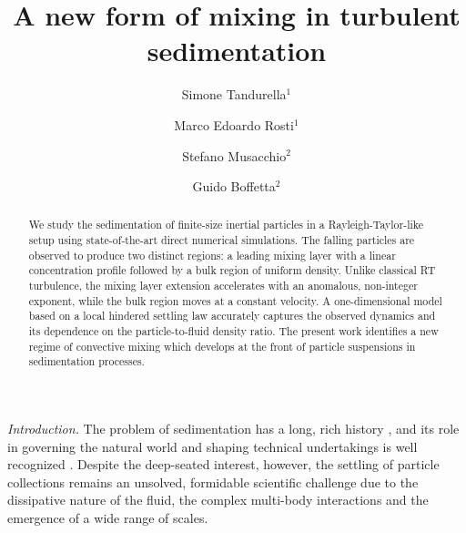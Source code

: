 \documentclass[aps,prl,twocolumn,showpacs,longbibliography]{revtex4-1}
\begin{document}

\title{A new form of mixing in turbulent sedimentation}






\author{Simone Tandurella$^{1}$}

\author{Marco Edoardo Rosti$^{1}$}

\author{Stefano Musacchio$^{2}$}

\author{Guido Boffetta$^{2}$}


\begin{abstract}
We study the sedimentation of finite-size inertial particles in a
Rayleigh-Taylor-like setup using state-of-the-art direct numerical simulations.
The falling particles are observed to produce two distinct regions: a leading mixing layer with a linear concentration profile followed by a bulk region of uniform density.
Unlike classical RT turbulence, the mixing layer extension accelerates with an anomalous, non-integer exponent, while the bulk region moves at a constant velocity.
A one-dimensional model based on a local hindered settling law accurately captures the observed
dynamics and its dependence on the particle-to-fluid density ratio. The present work
identifies a new regime of convective mixing
which develops at the front of particle suspensions in sedimentation processes.













\end{abstract}

\pacs{}

\maketitle


{\it Introduction.}
The problem of sedimentation has a long, rich history \cite{newton1687principia},
and its role in governing the natural world and shaping technical undertakings is well recognized \cite{lamb2020mud,koyaguchi1990sedimentation,meiburg-kneller2010,guazzelli2011physical}. Despite the deep-seated interest, however, the settling of particle collections remains an unsolved, formidable scientific challenge due to the dissipative nature of the fluid, the complex multi-body interactions and the emergence of a wide range of scales.
\end{document}
